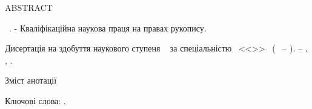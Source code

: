 \noindent
ABSTRACT						

\vspace{0.7cm}
\noindent
\thesisAuthorFIOen~\thesisTitle. - Кваліфікаційна наукова праця на правах рукопису.

\vspace{0.7cm}
\noindent
Дисертація на здобуття наукового ступеня \thesisDegree~
за спеціальністю \thesisSpecialtyNumber~<<\thesisSpecialtyTitle>>~
(\thesisKnowledgeNumber~ -- \thesisKnowledgeTitle). -- \thesisOrganizationEn, \thesisCityEn, \thesisYear.

\vspace{0.7cm}
Зміст анотації

\vspace{0.7cm}
\noindent
Ключові слова: \keywordsEn.

\vspace{2cm}



